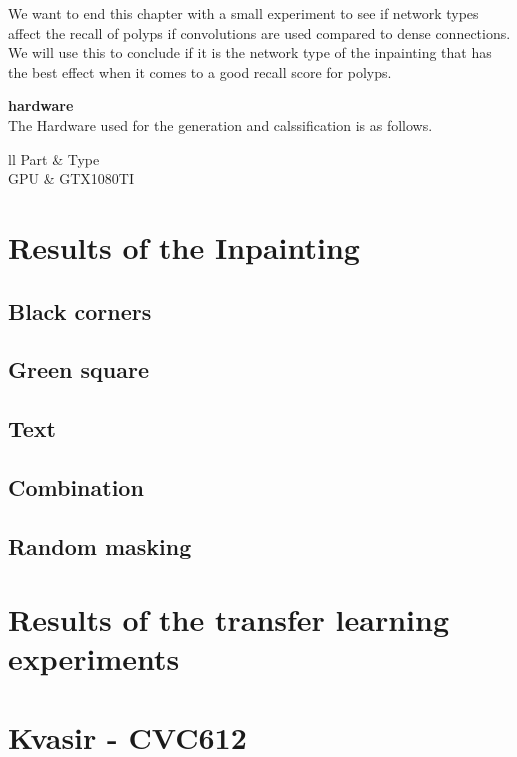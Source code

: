 We want to end this chapter with a small experiment to see if network types affect the recall of polyps if convolutions are used compared to dense connections. We will use this to conclude if it is the network type of the inpainting that has the best effect when it comes to a good recall score for polyps.


\textbf{hardware}\\
The Hardware used for the generation and calssification is as follows.
\begin{table}[t]
\caption{Hardware for things}
\begin{center}
\begin{tabular}{ll}
\toprule
{}
{Part}           & Type \\ 
\midrule
GPU               & GTX1080TI     \\ 
\bottomrule
\end{tabular}
\end{center}
\label{tab:I}
\end{table}




\section{Results of the Inpainting}
    \subsection{Black corners}
    \subsection{Green square}
    \subsection{Text}
    \subsection{Combination}
    \subsection{Random masking}


\section{Results of the transfer learning experiments}

    
\section{Kvasir -  CVC612}
